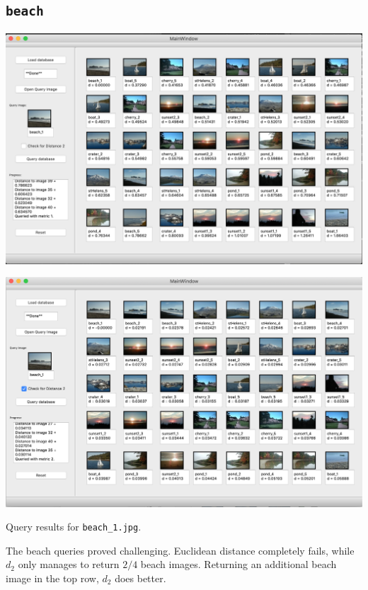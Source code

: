 \documentclass[letterpaper]{article}
\begin{document}
\subsection{\texttt{beach}}
\begin{center}
  \includegraphics[width=\textwidth]{beach_1_distance1.png}
  
  \includegraphics[width=\textwidth]{beach_1_distance2.png}
  
  Query results for \texttt{beach\_1.jpg}.
\end{center}

The beach queries proved challenging. Euclidean distance completely fails, while
$d_2$ only manages to return $2/4$ beach images. Returning an additional beach
image in the top row, $d_2$ does better.
\end{document}
